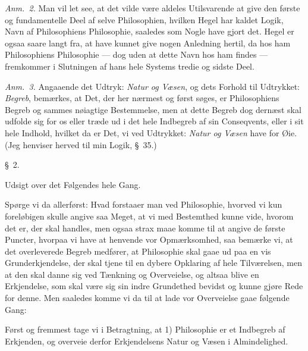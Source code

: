 \documentclass[12pt,a4paper]{book}
\newcommand{\apage}[1]{\marginnote{\footnotesize\textit{[#1]}}}
\begin{document}
{\small\emph{Anm.~2.} Man vil let see, at det vilde være aldeles Utilsvarende
at give den første og fundamentelle Deel af selve Philosophien, hvilken Hegel
har kaldet Logik, Navn af Philosophiens Philosophie, saaledes som Nogle have
gjort det. Hegel er ogsaa saare langt fra, at have kunnet give nogen Anledning
hertil, da hos ham Philosophiens Philosophie --- dog uden at dette Navn hos ham
findes --- fremkommer i Slutningen af hans hele Systems tredie og sidste
Deel.\par} \apage{4} 

{\small\emph{Anm.~3.} Angaaende det Udtryk: \emph{Natur og Væsen}, og dets
Forhold til Udtrykket: \emph{Begreb}, bemærkes, at Det, der her nærmest og
først søges, er Philosophiens Begreb og sammes nøiagtige Bestemmelse, men at
dette Begreb dog dernæst skal udfolde sig for os eller træde ud i det hele
Indbegreb af sin Conseqvents, eller i sit hele Indhold, hvilket da er Det, vi
ved Udtrykket: \emph{Natur og Væsen} have for Øie. (Jeg henviser herved til min
Logik, \S~35.)\par}

\begin{center}\large\S~2.\end{center}
\begin{center}Udsigt over det Følgendes hele Gang.\end{center}

Spørge vi da allerførst: Hvad forstaaer man ved Philosophie, hvorved vi kun
foreløbigen skulle angive saa Meget, at vi med Bestemthed kunne vide, hvorom
det er, der skal handles, men ogsaa strax maae komme til at angive de første
Puncter, hvorpaa vi have at henvende vor Opmærksomhed, saa bemærke vi, at det
overleverede Begreb medfører, at Philosophie skal gaae ud paa en vis
Grunderkjendelse, der skal tjene til en dybere Opklaring af hele Tilværelsen,
men at den skal danne sig ved Tænkning og Overveielse, og altsaa blive en
Erkjendelse, som skal være sig sin indre Grundethed bevidst og kunne gjøre Rede
for denne. Men saaledes komme vi da til at lade vor Overveielse gaae følgende
Gang:

Først og fremmest tage vi i Betragtning, at 1) Philosophie er et Indbegreb af
Erkjenden, og overveie derfor Erkjendelsens Natur og Væsen i Almindelighed.
\end{document}
